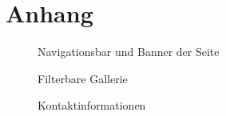 \chapter{Anhang}
\begin{figure}[!h]
	\caption{Navigationsbar und Banner der Seite}
	\label{fig:navbarBanner}
\end{figure}

\begin{figure}[!h]
	\caption{Filterbare Gallerie}
	\label{fig:gallery}
\end{figure}

\begin{figure}[!h]
	\caption{Kontaktinformationen}
	\label{fig:contact}
\end{figure}

